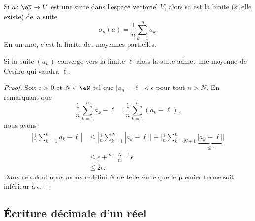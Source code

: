 \begin{definition}      \label{DEFooLVRLooTeowkn}
	Si \( a\colon \eN\to V \) est une suite dans l'espace vectoriel \( V\), alors sa  est la limite (si elle existe) de la suite
	\begin{equation}
		\sigma_n(a)=\frac{1}{ n }\sum_{k=1}^na_k.
	\end{equation}
	En un mot, c'est la limite des moyennes partielles.
\end{definition}

\begin{lemma}       \label{LemyGjMqM}
	Si la suite \( (a_n)\) converge vers la limite \( \ell\) alors la suite admet une moyenne de Cesàro qui vaudra \( \ell\).
\end{lemma}

\begin{proof}
	Soit \( \epsilon>0\) et \( N\in \eN\) tel que \( | a_n-\ell |<\epsilon\) pour tout \( n>N\). En remarquant que
	\begin{equation}
		\frac{1}{ n }\sum_{k=1}^na_k-\ell=\frac{1}{ n }\sum_{k=1}^n(a_k-\ell),
	\end{equation}
	nous avons
	\begin{subequations}
		\begin{align}
			| \frac{1}{ n }\sum_{k=1}^na_k-\ell | & \leq| \frac{1}{ n }\sum_{k=1}^N| a_k-\ell | |+\big| \frac{1}{ n }\sum_{k=N+1}^n\underbrace{| a_k-\ell |}_{\leq \epsilon} \big| \\
			                                      & \leq \epsilon+\frac{ n-N-1 }{ n }\epsilon                                                                                      \\
			                                      & \leq 2\epsilon.
		\end{align}
	\end{subequations}
	Dans ce calcul nous avons redéfini \( N\) de telle sorte que le premier terme soit inférieur à \( \epsilon\).
\end{proof}

\subsection{Écriture décimale d'un réel}

